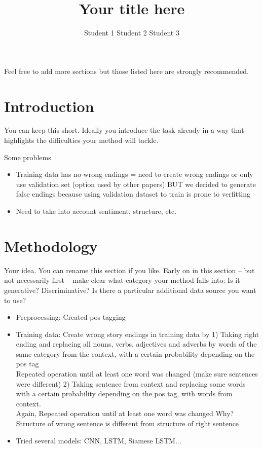 \documentclass{article}
\title{Your title here}
\author{Student 1 \qquad Student 2 \qquad Student 3}
\begin{document}

\maketitle


Feel free to add more sections but those listed here are strongly recommended.
\section{Introduction}
You can keep this short. Ideally you introduce the task already in a way that highlights the difficulties  your method will tackle.

Some problems
\begin{itemize}
    \item Training data has no wrong endings = need to create wrong endings or only use validation set (option used by other papers)
            BUT we decided to generate false endings because using validation dataset to train is prone to verfitting
    \item Need to take into account sentiment, structure, etc.
\end{itemize}

\section{Methodology}
Your idea. You can rename this section if you like. Early on in this section -- but not necessarily first -- make clear what category your method falls into: Is it generative? Discriminative? Is there a particular additional data source you want to use?

\begin{itemize}
    \item Preprocessing: Created pos tagging
    \item Training data: Create wrong story endings in training data by
                            1) Taking right ending and replacing all nouns, verbs, adjectives and adverbs by words of the same category from the context, with a certain probability depending on the pos tag\\
                            Repeated operation until at least one word was changed (make sure sentences were different)
                            2) Taking sentence from context and replacing some words with a certain probability depending on the pos tag, with words from context.\\
                            Again, Repeated operation until at least one word was changed
                            Why? Structure of wrong sentence is different from structure of right sentence
    \item Tried several models: CNN, LSTM, Siamese LSTM...


\end{itemize}
\end{document}
